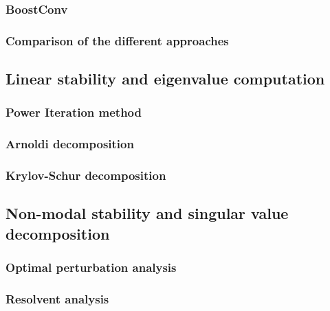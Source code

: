     \subsubsection{BoostConv}


    \subsubsection{Comparison of the different approaches}



  \subsection{Linear stability and eigenvalue computation}

    \subsubsection{Power Iteration method}

    \subsubsection{Arnoldi decomposition}

    \subsubsection{Krylov-Schur decomposition}





  \subsection{Non-modal stability and singular value decomposition}

    \subsubsection{Optimal perturbation analysis}

    \subsubsection{Resolvent analysis}
